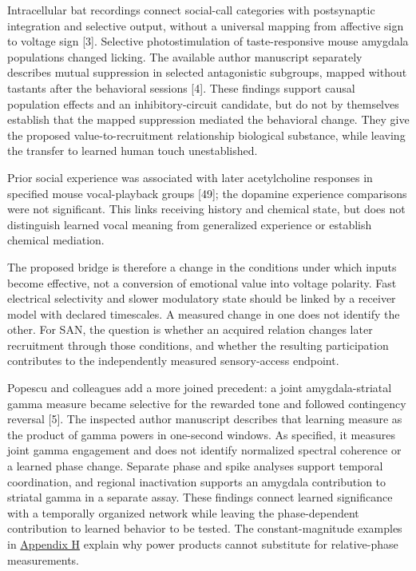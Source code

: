 \documentclass[
  american,
  11pt,
  letterpaper,
]{article}
\begin{document}
Intracellular bat recordings connect social-call categories with postsynaptic integration and selective output, without a universal mapping from affective sign to voltage sign {[}3{]}. Selective photostimulation of taste-responsive mouse amygdala populations changed licking. The available author manuscript separately describes mutual suppression in selected antagonistic subgroups, mapped without tastants after the behavioral sessions {[}4{]}. These findings support causal population effects and an inhibitory-circuit candidate, but do not by themselves establish that the mapped suppression mediated the behavioral change. They give the proposed value-to-recruitment relationship biological substance, while leaving the transfer to learned human touch unestablished.

Prior social experience was associated with later acetylcholine responses in specified mouse vocal-playback groups {[}49{]}; the dopamine experience comparisons were not significant. This links receiving history and chemical state, but does not distinguish learned vocal meaning from generalized experience or establish chemical mediation.

The proposed bridge is therefore a change in the conditions under which inputs become effective, not a conversion of emotional value into voltage polarity. Fast electrical selectivity and slower modulatory state should be linked by a receiver model with declared timescales. A measured change in one does not identify the other. For SAN, the question is whether an acquired relation changes later recruitment through those conditions, and whether the resulting participation contributes to the independently measured sensory-access endpoint.

Popescu and colleagues add a more joined precedent: a joint amygdala-striatal gamma measure became selective for the rewarded tone and followed contingency reversal {[}5{]}. The inspected author manuscript describes that learning measure as the product of gamma powers in one-second windows. As specified, it measures joint gamma engagement and does not identify normalized spectral coherence or a learned phase change. Separate phase and spike analyses support temporal coordination, and regional inactivation supports an amygdala contribution to striatal gamma in a separate assay. These findings connect learned significance with a temporally organized network while leaving the phase-dependent contribution to learned behavior to be tested. The constant-magnitude examples in \href{https://raw.githubusercontent.com/v5ma/v5ma.github.io/master/papers/companions/learning-to-feel-v1.0/Learning-to-Feel-Technical-Supplement-v1.0.pdf\#appendix-h}{Appendix H} explain why power products cannot substitute for relative-phase measurements.
\end{document}
